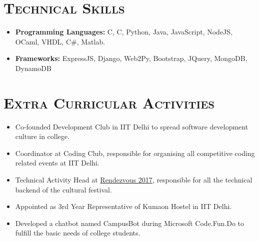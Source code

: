 \documentclass{article}
\newenvironment{longversion}{}{} %
\newcommand{\CPP}
{C\nolinebreak[4]\hspace{-.05em}\raisebox{.22ex}{\footnotesize\bf ++}}
\newcommand{\tmpsection}[1]{}
\let\tmpsection=\section
\renewcommand{\section}[1]{\tmpsection*{\textsc{#1}}}
\begin{document}
\begin{longversion}
\section{Technical Skills}\begin{itemize}
\item \textbf{Programming Languages:}  C, \CPP, Python, Java, JavaScript, NodeJS, OCaml, VHDL, C\#, Matlab.
\item \textbf{Frameworks:} ExpressJS, Django, Web2Py, Bootstrap, JQuery, MongoDB, DynamoDB


\end{itemize}

\end{longversion}

\section{Extra Curricular Activities}


\begin{itemize}
    \setlength\itemsep{0em}
    \item Co-founded Development Club in IIT Delhi to spread software development culture in college.
    \item Coordinator at Coding Club, responsible for organising all competitive coding related events at IIT Delhi.
    \item Technical Activity Head at \href{http://rdv-iitd.com/}{Rendezvous 2017}, responsible for all the technical backend of the cultural festival.
    \item Appointed as 3rd Year Representative of Kumaon Hostel in IIT Delhi.
    \item Developed a chatbot named CampusBot during Microsoft Code.Fun.Do to fulfill the basic needs of college students.
     
\end{itemize}
\end{document}
